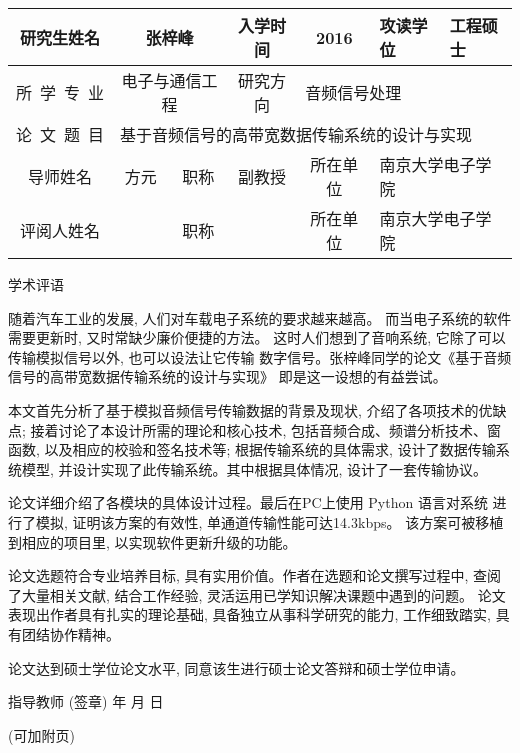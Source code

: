 \documentclass[a4paper,12pt]{article}
\newcommand*{\kaishu}{\CJKfamily{kaiti}}     %
\newcommand*{\heiti}{\CJKfamily{heiti}}     %
\begin{document}
\pagestyle{empty}
\fontsize{12}{16}\selectfont
\begin{center}
\begin{tabularx}{\textwidth}{c|c|c|c|c|X|X}
研究生姓名 & \multicolumn{2}{c|}{张梓峰} & 入学时间 & 2016 & 攻读学位
        & 工程硕士\\\hline
所~学~专~业   & \multicolumn{2}{c|}{电子与通信工程}
        & 研究方向 & \multicolumn{3}{l|}{音频信号处理}\\\hline
论~文~题~目 & \multicolumn{6}{l|}{基于音频信号的高带宽数据传输系统的设计与实现}\\\hline
    导师姓名 & 方元 & 职称 & 副教授 & 所在单位 &
    \multicolumn{2}{l|}{南京大学电子学院}\\\hline
    评阅人姓名  &  & 职称 &      & 所在单位 & 
    \multicolumn{2}{l|}{南京大学电子学院}\\\hline
\end{tabularx}
\vskip 8mm
\Large \kaishu 学术评语\end{center}

\fontsize{12}{14}\selectfont

随着汽车工业的发展, 人们对车载电子系统的要求越来越高。
而当电子系统的软件需要更新时, 又时常缺少廉价便捷的方法。
这时人们想到了音响系统, 它除了可以传输模拟信号以外, 也可以设法让它传输
数字信号。张梓峰同学的论文《基于音频信号的高带宽数据传输系统的设计与实现》
即是这一设想的有益尝试。

本文首先分析了基于模拟音频信号传输数据的背景及现状, 介绍了各项技术的优缺点;
接着讨论了本设计所需的理论和核心技术, 包括音频合成、频谱分析技术、窗函数, 
以及相应的校验和签名技术等; 根据传输系统的具体需求, 设计了数据传输系统模型,
并设计实现了此传输系统。其中根据具体情况, 设计了一套传输协议。

论文详细介绍了各模块的具体设计过程。最后在PC上使用 Python 语言对系统
进行了模拟, 证明该方案的有效性, 单通道传输性能可达14.3kbps。
该方案可被移植到相应的项目里, 以实现软件更新升级的功能。

论文选题符合专业培养目标, 具有实用价值。作者在选题和论文撰写过程中,
查阅了大量相关文献, 结合工作经验, 灵活运用已学知识解决课题中遇到的问题。
论文表现出作者具有扎实的理论基础, 具备独立从事科学研究的能力, 工作细致踏实, 具有团结协作精神。

论文达到硕士学位论文水平, 同意该生进行硕士论文答辩和硕士学位申请。

\vfill
\hfill {\heiti 指导教师} \underline{\hskip 35mm} (签章)\qquad\qquad
\vskip 3mm
\hfill 年\hskip 12mm 月\hskip 12mm 日\qquad\qquad

\noindent(可加附页)
\end{document}
